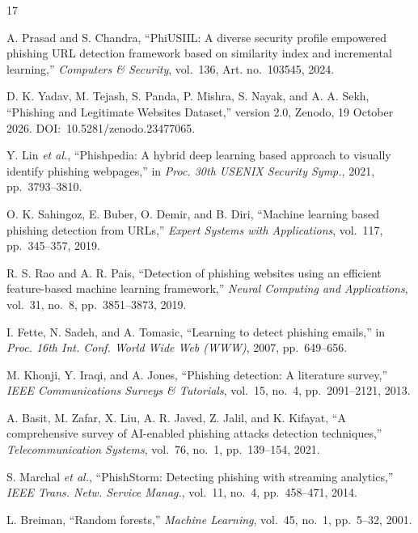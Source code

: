 \documentclass[11pt,journal,a4paper]{IEEEtran}
\begin{document}
\begin{thebibliography}{17}
\fontsize{11}{13.2}\selectfont

A. Prasad and S. Chandra, ``PhiUSIIL: A diverse security profile empowered phishing URL detection framework
based on similarity index and incremental learning,'' \emph{Computers \& Security}, vol.~136, Art. no.~103545,
2024.

D. K. Yadav, M. Tejash, S. Panda, P. Mishra, S. Nayak, and A. A. Sekh, ``Phishing and Legitimate Websites
Dataset,'' version 2.0, Zenodo, 19 October 2026. DOI:~10.5281/zenodo.23477065.

Y. Lin \emph{et al.}, ``Phishpedia: A hybrid deep learning based approach to visually identify phishing
webpages,'' in \emph{Proc. 30th USENIX Security Symp.}, 2021, pp.~3793--3810.

O. K. Sahingoz, E. Buber, O. Demir, and B. Diri, ``Machine learning based phishing detection from URLs,''
\emph{Expert Systems with Applications}, vol.~117, pp.~345--357, 2019.

R. S. Rao and A. R. Pais, ``Detection of phishing websites using an efficient feature-based machine learning
framework,'' \emph{Neural Computing and Applications}, vol.~31, no.~8, pp.~3851--3873, 2019.

I. Fette, N. Sadeh, and A. Tomasic, ``Learning to detect phishing emails,'' in \emph{Proc. 16th Int. Conf.
World Wide Web (WWW)}, 2007, pp.~649--656.

M. Khonji, Y. Iraqi, and A. Jones, ``Phishing detection: A literature survey,'' \emph{IEEE Communications
Surveys \& Tutorials}, vol.~15, no.~4, pp.~2091--2121, 2013.

A. Basit, M. Zafar, X. Liu, A. R. Javed, Z. Jalil, and K. Kifayat, ``A comprehensive survey of AI-enabled
phishing attacks detection techniques,'' \emph{Telecommunication Systems}, vol.~76, no.~1, pp.~139--154, 2021.

S. Marchal \emph{et al.}, ``PhishStorm: Detecting phishing with streaming analytics,'' \emph{IEEE Trans. Netw.
Service Manag.}, vol.~11, no.~4, pp.~458--471, 2014.

L. Breiman, ``Random forests,'' \emph{Machine Learning}, vol.~45, no.~1, pp.~5--32, 2001.


\end{thebibliography}
\end{document}
